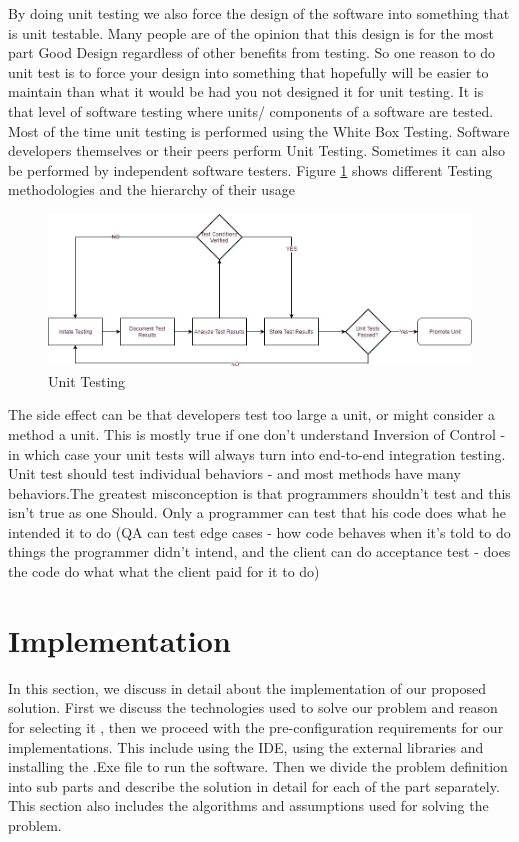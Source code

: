 \documentclass[article,type=msc,colorback,accentcolor=tud9c,twoside,11pt]{tudthesis}
\begin{document}
 By doing unit testing we also force the design of the software into something that is unit testable. Many people are of the opinion that this design is for the most part Good Design regardless of other benefits from testing. So one reason to do unit test is to force your design into something that hopefully will be easier to maintain than what it would be had you not designed it for unit testing. It is that level of software testing where units/ components of a software are tested. Most of the time unit testing is performed using the White Box Testing. Software developers themselves or their peers perform Unit Testing. Sometimes it can also be performed by independent software testers. Figure \ref{fig:UnitTesting} shows different Testing methodologies and the hierarchy of their usage
\begin{figure}[h]
	\centering
	\includegraphics[scale=0.5]{UnitTesting.jpg}
	\caption{Unit Testing}
	\label{fig:UnitTesting}
\end{figure}

The side effect can be that developers test too large a unit, or might consider a method a unit. This is mostly true if one don't understand Inversion of Control - in which case your unit tests will always turn into end-to-end integration testing. Unit test should test individual behaviors - and most methods have many behaviors.The greatest misconception is that programmers shouldn't test and this isn't true as one Should. Only a programmer can test that his code does what he intended it to do (QA can test edge cases - how code behaves when it's told to do things the programmer didn't intend, and the client can do acceptance test - does the code do what what the client paid for it to do)
\clearpage
\clearpage
\section{Implementation}
In this section, we discuss in detail about the implementation of our proposed solution. First we discuss the technologies used to solve our problem and reason for selecting it , then we proceed with the pre-configuration requirements for our implementations. This include using the IDE, using the external libraries and installing the .Exe file to run the software. Then we divide the problem definition into sub parts and describe the solution in detail for each of the part separately. This section also includes the algorithms and assumptions used for solving the problem.
\end{document}
